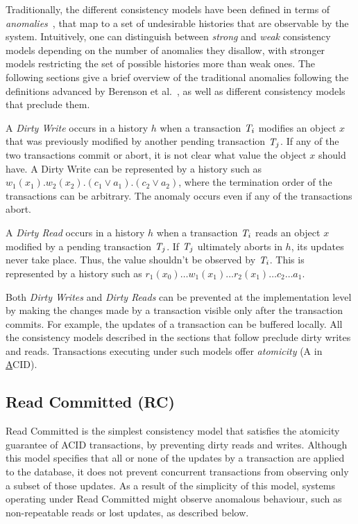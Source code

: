 Traditionally, the different consistency models have been defined in terms of \emph{anomalies}~\citep{sql-critique}, that map to a set of undesirable histories that are observable by the system. Intuitively, one can distinguish between \emph{strong} and \emph{weak} consistency models depending on the number of anomalies they disallow, with stronger models restricting the set of possible histories more than weak ones. The following sections give a brief overview of the traditional anomalies following the definitions advanced by Berenson et al.~\citep{sql-critique}, as well as different consistency models that preclude them.

\begin{definition}
A \emph{Dirty Write} occurs in a history $h$ when a transaction $\mathit{T}_i$ modifies an object $x$ that was previously modified by another pending transaction $\mathit{T}_j$. If any of the two transactions commit or abort, it is not clear what value the object $x$ should have. A Dirty Write can be represented by a history such as $w_1(x_1).w_2(x_2).(c_1 \vee a_1).(c_2 \vee a_2)$, where the termination order of the transactions can be arbitrary. The anomaly occurs even if any of the transactions abort.
\end{definition}

\begin{definition}
A \emph{Dirty Read} occurs in a history $h$ when a transaction $\mathit{T}_i$ reads an object $x$ modified by a pending transaction $\mathit{T}_j$. If $\mathit{T}_j$ ultimately aborts in $h$, its updates never take place. Thus, the value shouldn't be observed by $\mathit{T}_i$. This is represented by a history such as $r_1(x_0)\ldots w_1(x_1)\ldots r_2(x_1)\ldots c_2\ldots a_1$.
\end{definition}

Both \emph{Dirty Writes} and \emph{Dirty Reads} can be prevented at the implementation level by making the changes made by a transaction visible only after the transaction commits. For example, the updates of a transaction can be buffered locally. All the consistency models described in the sections that follow preclude dirty writes and reads. Transactions executing under such models offer \emph{atomicity} (A in \underline{A}CID).

\subsection{Read Committed (RC)}

Read Committed is the simplest consistency model that satisfies the atomicity guarantee of ACID transactions, by preventing dirty reads and writes. Although this model specifies that all or none of the updates by a transaction are applied to the database, it does not prevent concurrent transactions from observing only a subset of those updates. As a result of the simplicity of this model, systems operating under Read Committed might observe anomalous behaviour, such as non-repeatable reads or lost updates, as described below.

